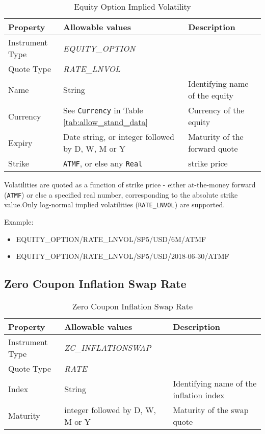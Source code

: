 \begin{table}[H]
	\centering
	\begin{tabular}{|p{3cm}|p{3.5cm}|p{7cm}|}
		\hline
		{\bf Property} & {\bf Allowable values} & {\bf Description} \\ \hline
        Instrument Type & \emph{EQUITY\_OPTION} & \\ \hline
        Quote Type & \emph{RATE\_LNVOL} & \\ \hline
        Name & String & Identifying name of the equity \\ \hline
        Currency & See \lstinline!Currency! in Table \ref{tab:allow_stand_data}&  Currency of the equity \\ \hline
        Expiry & Date string, or integer followed by D, W, M or Y & Maturity of the forward quote \\ \hline
        Strike & {\tt ATMF}, or else any {\tt Real} & strike price \\ \hline
	\end{tabular}
	\caption{Equity Option Implied Volatility}
	\label{tab:eqimplvol_quote}
\end{table}

Volatilities are quoted as a function of strike price - either at-the-money forward ({\tt ATMF}) or else a specified 
real number, corresponding to the absolute strike value.Only log-normal implied volatilities ({\tt RATE\_LNVOL}) are 
supported.

\medskip
Example:
\begin{itemize}
	\item {EQUITY\_OPTION/RATE\_LNVOL/SP5/USD/6M/ATMF}
	\item {EQUITY\_OPTION/RATE\_LNVOL/SP5/USD/2018-06-30/ATMF}
\end{itemize}

\subsection{Zero Coupon Inflation Swap Rate}

\begin{table}[H]
    \centering
    \begin{tabular}{|p{3cm}|p{3.5cm}|p{7cm}|}
      \hline
      {\bf Property} & {\bf Allowable values} & {\bf Description} \\ \hline
      Instrument Type & \emph{ZC\_INFLATIONSWAP} & \\ \hline
      Quote Type & \emph{RATE} & \\ \hline
      Index & String & Identifying name of the inflation index \\ \hline
      Maturity & integer followed by D, W, M or Y & Maturity of the swap quote \\ \hline
    \end{tabular}
    \caption{Zero Coupon Inflation Swap Rate}
    \label{tab:zcinflationswap_quote}
\end{table}

